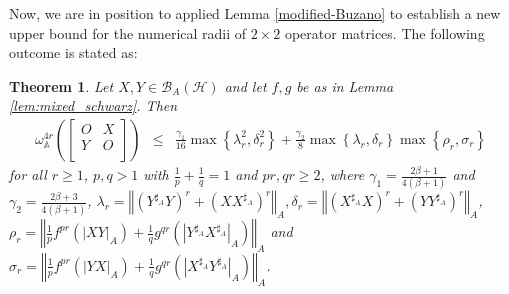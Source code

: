 \documentclass{article}
\newcommand{\bra}[1]{\left(#1\right)}
\newcommand{\normA}[1]{{\left\Vert#1\right\Vert}_{A}}
\newcommand{\set}[1]{\left\{#1\right\}}
\newcommand {\A}{\mathbb{A}}
\newcommand {\h}{\mathcal{H}}
\newcommand {\Xa}{X^{\sharp_{A}}}
\renewcommand {\b}{\mathcal{B}}
\newcommand {\Ya}{Y^{\sharp_{A}}}
\newtheorem{theorem}{Theorem}[section]
\begin{document}
Now, we are in position to applied Lemma \ref{modified-Buzano} to
establish a new upper bound for the numerical radii of $2\times 2$ operator matrices.
The following outcome is stated as:
\begin{theorem}\label{Theorem2.16} Let $X,Y\in\b_A(\h)$ and let $f, g$ be as in Lemma \ref{lem:mixed_schwarz}. Then
\begin{eqnarray}\label{MALIK-A1}
  \omega_{\A}^{4r}\bra{\begin{bmatrix} O& X\\ Y& O \\\end{bmatrix}}&\leq&\frac{\gamma_1}{16}\max\set{\lambda_r^2,\delta_r^2}
   +\frac{\gamma_2}{8}\max\set{\lambda_r,\delta_r}\max\set{\rho_r,\sigma_r}
\end{eqnarray}
for all $r \geq1$, $p, q > 1$ with $\frac{1}{p}+\frac{1}{q}=1$ and $pr,qr\geq  2$, where $\gamma_1=\frac{2\beta+1}{4(\beta+1)}$ and $\gamma_2=\frac{2\beta+3}{4(\beta+1)}$, $\lambda_r=\normA{(\Ya Y)^{r}+(X\Xa)^{r}},\delta_r=\normA{(\Xa X)^{r} +(Y\Ya)^{r}}$,
$\rho_r=\normA{\frac{1}{p}f^{pr}(|XY|_A)+\frac{1}{q}g^{qr}(|\Ya\Xa|_A)}$ and $\sigma_r=\normA{\frac{1}{p}f^{pr}(|YX|_A)+\frac{1}{q}g^{qr}(|\Xa\Ya|_A)}$.
\end{theorem}
\end{document}
